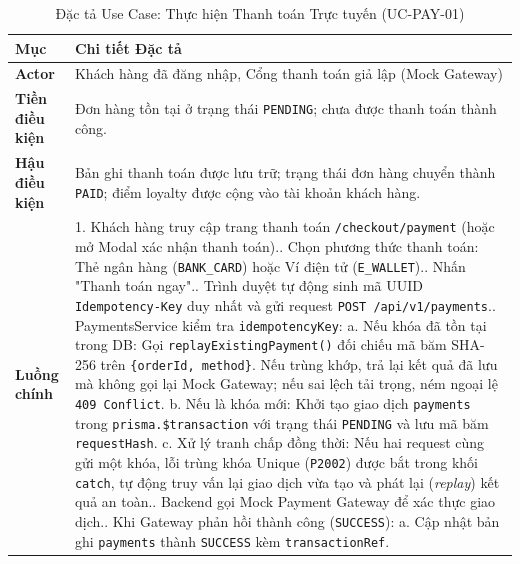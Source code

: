 \documentclass[12pt,a4paper,oneside]{report}
\begin{document}
\begin{table}[H]
\centering
\small
\caption{Đặc tả Use Case: Thực hiện Thanh toán Trực tuyến (UC-PAY-01)}
\label{tab:uc-spec-payment}
\begin{tabularx}{\textwidth}{p{2.8cm}X}
\toprule
\textbf{Mục} & \textbf{Chi tiết Đặc tả} \\
\midrule
\textbf{Actor} & Khách hàng đã đăng nhập, Cổng thanh toán giả lập (Mock Gateway) \\
\midrule
\textbf{Tiền điều kiện} & Đơn hàng tồn tại ở trạng thái \texttt{PENDING}; chưa được thanh toán thành công. \\
\midrule
\textbf{Hậu điều kiện} & Bản ghi thanh toán được lưu trữ; trạng thái đơn hàng chuyển thành \texttt{PAID}; điểm loyalty được cộng vào tài khoản khách hàng. \\
\midrule
\textbf{Luồng chính} & 
1. Khách hàng truy cập trang thanh toán \texttt{/checkout/payment} (hoặc mở Modal xác nhận thanh toán).\newline
2. Chọn phương thức thanh toán: Thẻ ngân hàng (\texttt{BANK\_CARD}) hoặc Ví điện tử (\texttt{E\_WALLET}).\newline
3. Nhấn "Thanh toán ngay".\newline
4. Trình duyệt tự động sinh mã UUID \texttt{Idempotency-Key} duy nhất và gửi request \texttt{POST /api/v1/payments}.\newline
5. PaymentsService kiểm tra \texttt{idempotencyKey}:\newline
\quad a. Nếu khóa đã tồn tại trong DB: Gọi \texttt{replayExistingPayment()} đối chiếu mã băm SHA-256 trên \texttt{\{orderId, method\}}. Nếu trùng khớp, trả lại kết quả đã lưu mà không gọi lại Mock Gateway; nếu sai lệch tải trọng, ném ngoại lệ \texttt{409 Conflict}.\newline
\quad b. Nếu là khóa mới: Khởi tạo giao dịch \texttt{payments} trong \texttt{prisma.\$transaction} với trạng thái \texttt{PENDING} và lưu mã băm \texttt{requestHash}.\newline
\quad c. Xử lý tranh chấp đồng thời: Nếu hai request cùng gửi một khóa, lỗi trùng khóa Unique (\texttt{P2002}) được bắt trong khối \texttt{catch}, tự động truy vấn lại giao dịch vừa tạo và phát lại (\textit{replay}) kết quả an toàn.\newline
6. Backend gọi Mock Payment Gateway để xác thực giao dịch.\newline
7. Khi Gateway phản hồi thành công (\texttt{SUCCESS}):\newline
\quad a. Cập nhật bản ghi \texttt{payments} thành \texttt{SUCCESS} kèm \texttt{transactionRef}.\newline

\end{tabularx}
\end{table}
\end{document}
